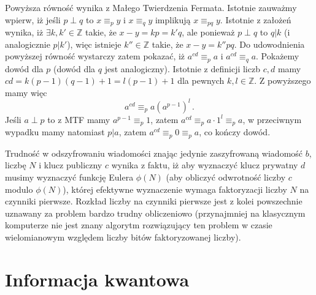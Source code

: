 \documentclass{myclass}
\begin{document}
Powyższa równość wynika z Małego Twierdzenia Fermata. Istotnie zauważmy wpierw, iż jeśli \(p \perp
q\) to \(x \equiv_p y\) i \(x \equiv_q y\) implikują \(x \equiv_{pq} y\). Istotnie z założeń wynika,
iż \(\exists k,k' \in \mathbb{Z}\) takie, że \(x - y = kp = k'q\), ale ponieważ \(p \perp q\) to \(q
| k\) (i analogicznie \(p | k'\)), więc istnieje \(k'' \in \mathbb{Z}\) takie, że \(x - y = k''
pq\). Do udowodnienia powyższej równość wystarczy zatem pokazać, iż \(a^{cd} \equiv_p a\) i \(a^{cd}
\equiv_q  a\). Pokażemy dowód dla \(p\) (dowód dla \(q\) jest analogiczny). Istotnie z definicji
liczb \(c,d\) mamy \(cd = k(p-1)(q-1) + 1 = l(p-1) + 1\) dla pewnych \(k,l\in\mathbb{Z}\). Z
powyższego mamy więc
\begin{equation*}
    a^{cd} \equiv_p a(a^{p-1})^l\,.
\end{equation*}
Jeśli \(a \perp p\) to z MTF mamy \(a^{p-1} \equiv_p 1\), zatem \(a^{cd} \equiv_p a\cdot1^l \equiv_p
a\), w przeciwnym wypadku mamy natomiast \(p | a\), zatem \(a^{cd} \equiv_p 0 \equiv_p a\), co
kończy dowód.

Trudność w odszyfrowaniu wiadomości znając jedynie zaszyfrowaną wiadomość \(b\), liczbę \(N\) i
klucz publiczny \(c\) wynika z faktu, iż aby wyznaczyć klucz prywatny \(d\) musimy wyznaczyć funkcję
Eulera \(\phi(N)\) (aby obliczyć odwrotność liczby \(c\) modulo \(\phi(N)\)), której efektywne
wyznaczenie wymaga faktoryzacji liczby \(N\) na czynniki pierwsze. Rozkład liczby na czynniki
pierwsze jest z kolei powszechnie uznawany za problem bardzo trudny obliczeniowo (przynajmniej na
klasycznym komputerze nie jest znany algorytm rozwiązujący ten problem w czasie wielomianowym
względem liczby bitów faktoryzowanej liczby).


\section{Informacja kwantowa}
\end{document}
